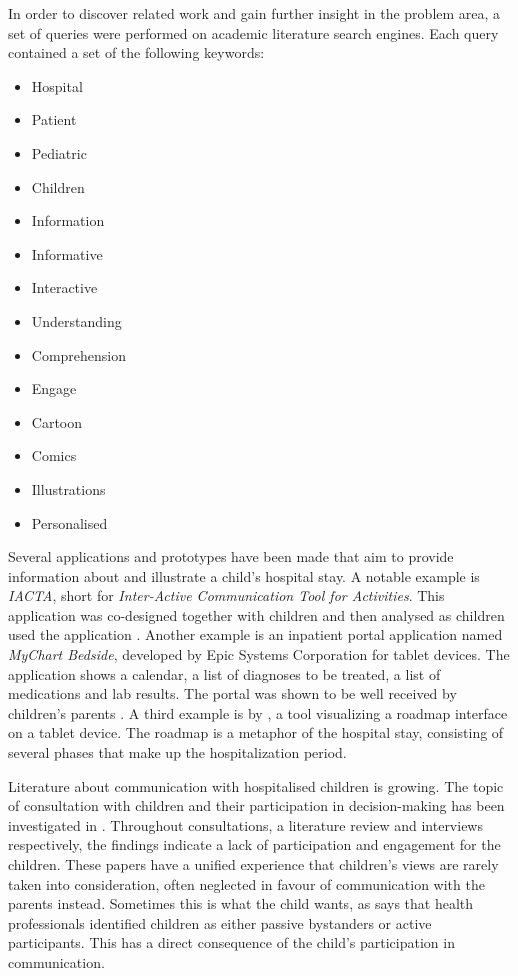 In order to discover related work and gain further insight in the problem area, a set of queries were performed on academic literature search engines. Each query contained a set of the following keywords:

\begin{multicols}{3}
    \raggedcolumns
    \begin{itemize}
        \item Hospital
        \item Patient
        \item Pediatric
        \item Children
        \item Information
        \item Informative
        \item Interactive
        \item Understanding
        \item Comprehension
        \item Engage
        \item Cartoon
        \item Comics
        \item Illustrations
        \item Personalised
    \end{itemize}
\end{multicols}


Several applications and prototypes have been made that aim to provide information about and illustrate a child's hospital stay. A notable example is \emph{IACTA}, short for \emph{Inter-Active Communication Tool for Activities}. This application was co-designed together with children \autocite{stalberg2016} and then analysed as children used the application \autocite{stalberg2018}. Another example is an inpatient portal application named \emph{MyChart Bedside}, developed by Epic Systems Corporation for tablet devices. The application shows a calendar, a list of diagnoses to be treated, a list of medications and lab results. The portal was shown to be well received by children's parents \autocite{kelly2017}. A third example is by \textcite{maher2016}, a tool visualizing a roadmap interface on a tablet device. The roadmap is a metaphor of the hospital stay, consisting of several phases that make up the hospitalization period.

Literature about communication with hospitalised children is growing. The topic of consultation with children and their participation in decision-making has been investigated in \textcite{coyne2006,coyne2008,coyne2011}. Throughout consultations, a literature review and interviews respectively, the findings indicate a lack of participation and engagement for the children. These papers have a unified experience that children's views are rarely taken into consideration, often neglected in favour of communication with the parents instead. Sometimes this is what the child wants, as \textcite{lambert2011} says that health professionals identified children as either passive bystanders or active participants. This has a direct consequence of the child's participation in communication.

